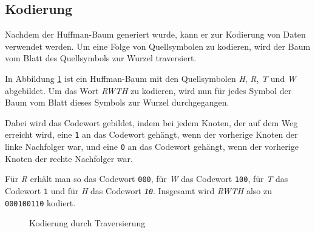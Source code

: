 \documentclass[twoside,11pt,a4paper]{article}
\theoremstyle{break}
\begin{document}

\subsection{Kodierung}

Nachdem der Huffman-Baum generiert wurde, kann er zur Kodierung von Daten
verwendet werden. Um eine Folge von Quellsymbolen zu kodieren, wird der Baum
vom Blatt des Quellsymbols zur Wurzel traversiert.

In Abbildung \ref{fig:HKOD} ist ein Huffman-Baum mit den Quellsymbolen \emph{H}, \emph{R},
\emph{T} und \emph{W} abgebildet. Um das Wort \emph{RWTH} zu kodieren, wird nun
für jedes Symbol der Baum vom Blatt dieses Symbols zur Wurzel durchgegangen.

Dabei wird das Codewort gebildet, indem bei jedem Knoten, der auf dem Weg erreicht wird,
eine {\tt1} an das Codewort gehängt, wenn der vorherige Knoten der linke Nachfolger war,
und eine {\tt0} an das Codewort gehängt, wenn der vorherige Knoten der rechte Nachfolger war.

Für \emph{R} erhält man so das Codewort {\tt000}, für \emph{W} das Codewort
{\tt100}, für \emph{T} das Codewort {\tt1} und für \emph{H} das Codewort
\emph{\tt10}. Insgesamt wird \emph{RWTH} also zu {\tt000100110} kodiert.


\begin{figure}[h]
\centering
{}
\caption{Kodierung durch Traversierung} \label{fig:HKOD}
\end{figure}
\end{document}
